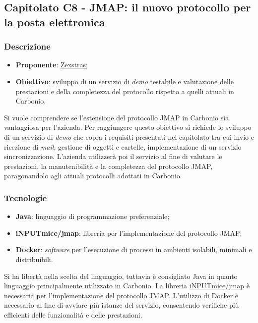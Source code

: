 \subsection{Capitolato C8 - JMAP: il nuovo protocollo per la posta elettronica}


\subsubsection{Descrizione}
\begin{itemize}
    \item \textbf{Proponente}: \href{https://zextras.com/it}{Zexstras};
    \item \textbf{Obiettivo}: sviluppo di un servizio di \textit{demo} testabile e valutazione delle prestazioni e della completezza del protocollo rispetto a quelli attuali in Carbonio.
\end{itemize}
Si vuole comprendere se l'estensione del protocollo JMAP in Carbonio sia vantaggiosa per l'azienda.
Per raggiungere questo obiettivo si richiede lo sviluppo di un servizio di \textit{demo} che copra i requisiti presentati nel capitolato tra cui invio e ricezione di \textit{mail}, gestione di oggetti e cartelle, implementazione di un servizio sincronizzazione.
L'azienda utilizzerà poi il servizio al fine di valutare le prestazioni, la manutenibilità e la completezza del protocollo JMAP, paragonandolo agli attuali protocolli adottati in Carbonio.

\subsubsection{Tecnologie}
\begin{itemize}
    \item \textbf{Java}: linguaggio di programmazione preferenziale;
    \item \textbf{iNPUTmice/jmap}: libreria per l'implementazione del protocollo JMAP;
    \item \textbf{Docker}: \textit{software} per l'esecuzione di processi in ambienti isolabili, minimali e distribuibili.
\end{itemize}
Si ha libertà nella scelta del linguaggio, tuttavia è consigliato Java in quanto linguaggio principalmente utilizzato in Carbonio.
La libreria \href{https://github.com/iNPUTmice/jmap}{iNPUTmice/jmap} è necessaria per l'implementazione del protocollo JMAP.
L'utilizzo di Docker è necessario al fine di avviare più istanze del servizio, consentendo verifiche più efficienti delle funzionalità e delle prestazioni.


